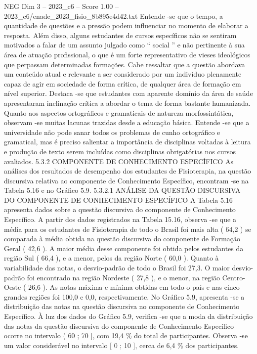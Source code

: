 \begin{textsample}{NEG Dim 3 – 2023\_c6 – Score 1.00 – 2023\_c6/enade\_2023\_fisio\_8b895e4d42.txt}
Entende -se que o tempo, a quantidade de questões e a pressão podem influenciar no momento de elaborar a resposta.
Além disso, alguns estudantes de cursos específicos não se sentiram motivados a falar de um assunto julgado como “ social ” e não pertinente à sua área de atuação profissional, o que é um forte representativo de vieses ideológicos que perpassam determinadas formações.
Cabe ressaltar que a questão abordava um conteúdo atual e relevante a ser considerado por um indivíduo plenamente capaz de agir em sociedade de forma crítica, de qualquer área de formação em nível superior.
Destaca -se que estudantes com aparente domínio da área de saúde apresentaram inclinação crítica a abordar o tema de forma bastante humanizada.
Quanto aos aspectos ortográficos e gramaticais de natureza morfossintática, observam -se muitas lacunas trazidas desde a educação básica.
Entende -se que a universidade não pode sanar todos os problemas de cunho ortográfico e gramatical, mas é preciso salientar a importância de disciplinas voltadas à leitura e produção de texto serem incluídas como disciplinas obrigatórias nos cursos avaliados. 5.3.2 COMPONENTE DE CONHECIMENTO ESPECÍFICO As análises dos resultados de desempenho dos estudantes de Fisioterapia, na questão discursiva relativa ao componente de Conhecimento Específico, encontram -se na Tabela 5.16 e no Gráfico 5.9. 5.3.2.1 ANÁLISE DA QUESTÃO DISCURSIVA DO COMPONENTE DE CONHECIMENTO ESPECÍFICO A Tabela 5.16 apresenta dados sobre a questão discursiva do componente de Conhecimento Específico.
A partir dos dados registrados na Tabela 15.16, observa -se que a média para os estudantes de Fisioterapia de todo o Brasil foi mais alta ( 64,2 ) se comparada à média obtida na questão discursiva do componente de Formação Geral ( 42,6 ).
A maior média desse componente foi obtida pelos estudantes da região Sul ( 66,4 ), e a menor, pelos da região Norte ( 60,0 ).
Quanto à variabilidade das notas, o desvio-padrão de todo o Brasil foi 27,3.
O maior desvio-padrão foi encontrado na região Nordeste ( 27,8 ), e o menor, na região Centro-Oeste ( 26,6 ).
As notas máxima e mínima obtidas em todo o país e nas cinco grandes regiões foi 100,0 e 0,0, respectivamente.
No Gráfico 5.9, apresenta -se a distribuição das notas na questão discursiva no componente de Conhecimento Específico.
À luz dos dados do Gráfico 5.9, verifica -se que a moda da distribuição das notas da questão discursiva do componente de Conhecimento Específico ocorre no intervalo ( 60 ; 70 ], com 19,4 \% do total de participantes.
Observa -se um valor considerável no intervalo [ 0 ; 10 ], cerca de 6,4 \% dos participantes.

\end{textsample}

